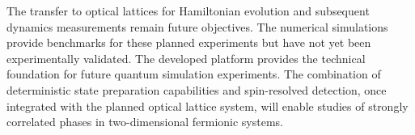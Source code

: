 The transfer to optical lattices for Hamiltonian evolution and subsequent dynamics measurements remain future objectives. The numerical simulations provide benchmarks for these planned experiments but have not yet been experimentally validated. The developed platform provides the technical foundation for future quantum simulation experiments. The combination of deterministic state preparation capabilities and spin-resolved detection, once integrated with the planned optical lattice system, will enable studies of strongly correlated phases in two-dimensional fermionic systems.


